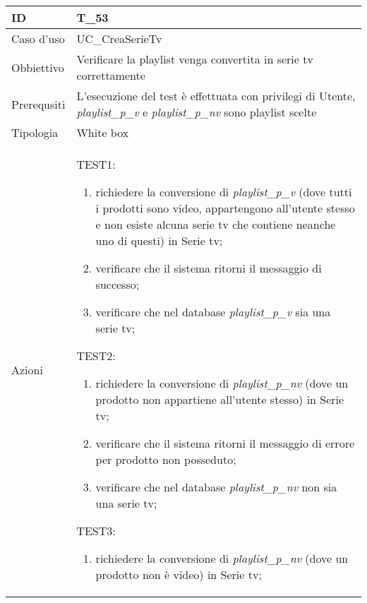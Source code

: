 \begin{table}[hb]
    \centering
    \begin{tabular}{ |p{2cm}|p{10cm}|  }
        \hline
        ID          & T\_53                                                                              \\\hline
        Caso d'uso  & UC\_CreaSerieTv                                                             \\\hline
        Obbiettivo  & Verificare la playlist venga convertita in serie tv correttamente               \\\hline
        Prerequsiti & L'esecuzione del test è effettuata con privilegi di Utente, \emph{playlist\_p\_v} e \emph{playlist\_p\_nv}
        sono playlist scelte                                                                            \\\hline
        Tipologia   & White box                                                                          \\\hline
        Azioni      &
        TEST1:
        \begin{enumerate}[nosep, topsep=0pt]
            \item richiedere la conversione di \emph{playlist\_p\_v} (dove tutti i prodotti sono video, appartengono
            all'utente stesso e non esiste alcuna serie tv che contiene neanche uno di questi) in Serie tv;
            \item verificare che il sistema ritorni il messaggio di successo;
            \item verificare che nel database \emph{playlist\_p\_v} sia una serie tv;
        \end{enumerate}
        \vspace{0.5cm} TEST2:
        \begin{enumerate}[nosep, topsep=0pt]
            \item richiedere la conversione di \emph{playlist\_p\_nv} (dove un prodotto non appartiene all'utente stesso) in Serie tv;
            \item verificare che il sistema ritorni il messaggio di errore per prodotto non posseduto;
            \item verificare che nel database \emph{playlist\_p\_nv} non sia una serie tv;
        \end{enumerate}
        \vspace{0.5cm} TEST3:
        \begin{enumerate}[nosep, topsep=0pt]
            \item richiedere la conversione di \emph{playlist\_p\_nv} (dove un prodotto non è video) in Serie tv;

\end{enumerate}
\end{tabular}
\end{table}
